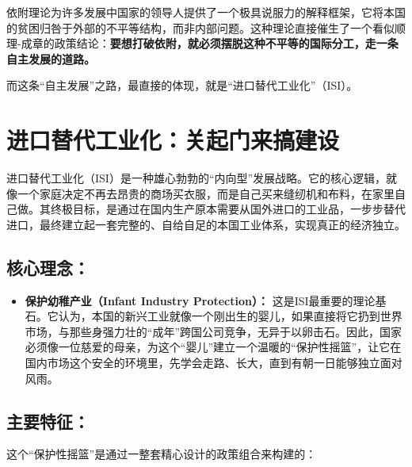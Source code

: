 依附理论为许多发展中国家的领导人提供了一个极具说服力的解释框架，它将本国的贫困归咎于外部的不平等结构，而非内部问题。这种理论直接催生了一个看似顺理-成章的政策结论：\textbf{要想打破依附，就必须摆脱这种不平等的国际分工，走一条自主发展的道路。}

而这条“自主发展”之路，最直接的体现，就是“进口替代工业化”（ISI）。

\section{进口替代工业化：关起门来搞建设}

进口替代工业化（ISI）是一种雄心勃勃的“内向型”发展战略。它的核心逻辑，就像一个家庭决定不再去昂贵的商场买衣服，而是自己买来缝纫机和布料，在家里自己做。其终极目标，是通过在国内生产原本需要从国外进口的工业品，一步步替代进口，最终建立起一套完整的、自给自足的本国工业体系，实现真正的经济独立。

\subsection{核心理念：}

\begin{itemize}
    \item \textbf{保护幼稚产业（Infant Industry Protection）：} 这是ISI最重要的理论基石。它认为，本国的新兴工业就像一个刚出生的婴儿，如果直接将它扔到世界市场，与那些身强力壮的“成年”跨国公司竞争，无异于以卵击石。因此，国家必须像一位慈爱的母亲，为这个“婴儿”建立一个温暖的“保护性摇篮”，让它在国内市场这个安全的环境里，先学会走路、长大，直到有朝一日能够独立面对风雨。
\end{itemize}

\subsection{主要特征：}

这个“保护性摇篮”是通过一整套精心设计的政策组合来构建的：

